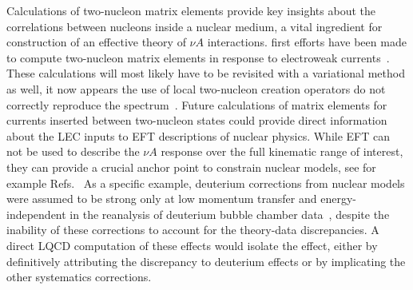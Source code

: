 Calculations of two-nucleon matrix elements provide key insights
 about the correlations between nucleons inside a nuclear medium,
 a vital ingredient for construction of an effective theory
 of $\nu A$ interactions.
 first efforts have been made to compute two-nucleon matrix elements in response to electroweak currents~\cite{Savage:2016kon,Chang:2017eiq}.
These calculations will most likely have to be revisited with a variational method as well,
  it now appears the use of local two-nucleon creation operators do not correctly
 reproduce the spectrum~\cite{Francis:2018qch,Horz:2020zvv,Green:2021qol,Amarasinghe:2021lqa}.
%
Future calculations of matrix elements for currents inserted between
 two-nucleon states could provide direct information about the LEC inputs to EFT descriptions of nuclear physics.
While EFT can not be used to describe the $\nu A$ response over the full kinematic range of interest, they can provide a crucial anchor point to constrain nuclear models, see for example Refs.~\cite{Kronfeld:2019nfb,Drischler:2019xuo,Tews:2020hgp,Davoudi:2020ngi}
As a specific example, deuterium corrections from nuclear models were assumed to be strong only at low momentum transfer
 and energy-independent in the reanalysis of deuterium bubble chamber data~\cite{Meyer:2016oeg},
 despite the inability of these corrections to account for the theory-data discrepancies.
A direct LQCD computation of these effects would isolate the effect,
 either by definitively attributing the discrepancy to deuterium effects
 or by implicating the other systematics corrections.
